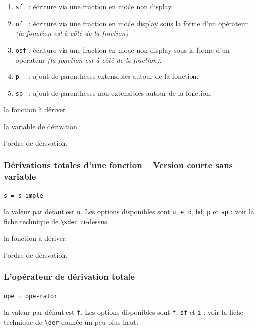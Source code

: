 \documentclass[12pt,a4paper]{book}
\newcommand\env[1]{\texttt{#1}}
\newcommand\macro[1]{\env{\textbackslash{}#1}}
\theoremstyle{definition}
\newcommand\mwhyprefix[2]{%
	\texttt{#1 = #1-#2}%
}
\begin{document}
{{\begin{enumerate}
	\item \verb+sf + : écriture via une fraction en mode non display.

	\item \verb+of + : écriture via une fraction en mode display sous la forme d'un opérateur \emph{(la fonction est à côté de la fraction)}.

	\item \verb+osf+ : écriture via une fraction en mode non display sous la forme d'un opérateur \emph{(la fonction est à côté de la fraction)}.

	\medskip
	
	\item \verb+p  + : ajout de parenthèses extensibles autour de la fonction.

	\item \verb+sp + : ajout de parenthèses non extensibles autour de la fonction.
\end{enumerate}


 la fonction à dériver.

 la variable de dérivation.

 l'ordre de dérivation.




\subsubsection{Dérivations totales d'une fonction -- Version courte sans variable} 



 \hfill \mwhyprefix{s}{imple}

\IDoption{} la valeur par défaut est \verb+u+. Les options disponibles sont \verb+u+, \verb+e+, \verb+d+, \verb+bd+, \verb+p+ et \verb+sp+ : voir la fiche technique de \macro{sder} ci-dessus.

 la fonction à dériver.

 l'ordre de dérivation.




\subsubsection{L'opérateur de dérivation totale} 



 \hfill \mwhyprefix{ope}{rator}

\IDoption{} la valeur par défaut est \verb+f+. Les options disponibles sont \verb+f+, \verb+sf+ et \verb+i+ : voir la fiche technique de \macro{der} donnée un peu plus haut.

}}
\end{document}
